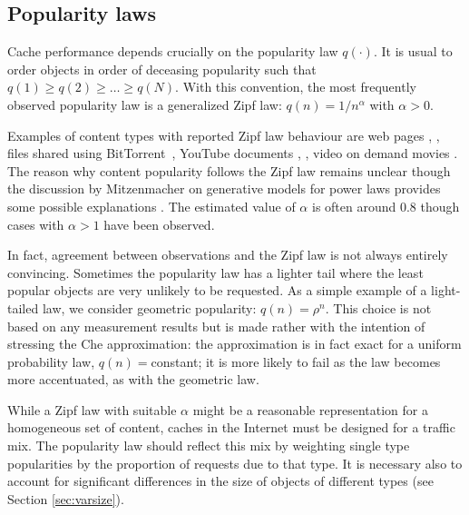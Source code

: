\documentclass{amsart}
\begin{document}
\subsection{Popularity laws}
Cache performance depends crucially on the popularity law $q(\cdot)$. It is usual to order objects in order of deceasing popularity such that $q(1)\ge q(2) \ge \ldots \ge q(N)$. With this convention, the most frequently observed popularity law is a generalized Zipf law: $q(n)=1/n^\alpha$ with $\alpha>0$. 

Examples of content types with reported Zipf law behaviour are web pages \cite{Breslau99},  \cite{Mahanti00}, files shared using BitTorrent~\cite{FRRS12}, YouTube documents \cite{Gill07},  \cite{Cha07},  video on demand movies  \cite{Yu06}. 
The reason why content popularity follows the Zipf law remains unclear though the discussion by Mitzenmacher on generative models for power laws provides some possible explanations \cite{Mitzenmacher03}. The estimated value of $\alpha$ is often around 0.8 though cases with $\alpha>1$ have been observed. 

In fact, agreement between observations and the Zipf law is not always entirely convincing. Sometimes the popularity law has a lighter tail where the least popular objects are very unlikely to be requested. As a simple example of a light-tailed law, we consider geometric popularity: $q(n)=\rho^n$. This choice is not based on any measurement results but is made rather with the intention of stressing the Che approximation: the approximation is in fact exact for a uniform probability law, $q(n)=$constant; it is more likely to fail as the law becomes more accentuated, as with the geometric law.

While a Zipf  law with suitable $\alpha$ might be a reasonable representation for a homogeneous set of content, caches in the Internet must be designed for a traffic mix. The popularity law should reflect this mix by weighting single type popularities by the proportion of requests due to that type. It is necessary also to account for significant differences in the size of objects of different types (see Section \ref{sec:varsize}). 
\end{document}
